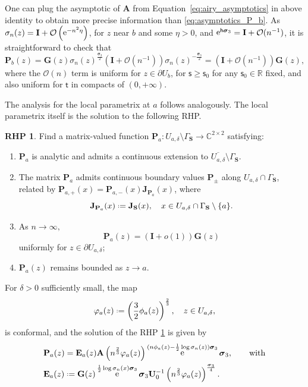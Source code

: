 \documentclass[reqno,a4paper,11pt]{amsart}
\DeclareMathOperator{\ee}{\rm e}
\newcommand{\C}{\mathbb{C}}
\newcommand{\R}{\mathbb{R}}
\newcommand{\boh}{\mathit{o}}
\newcommand{\Boh}{\mathcal{O}}
\newcommand*{\deff}{\mathrel{\vcenter{\baselineskip0.5ex \lineskiplimit0pt
                     \hbox{\scriptsize.}\hbox{\scriptsize.}}}%
                     =}
\renewcommand{\bm}{\mathbf}
\newcommand{\msf}{\mathsf}
\renewcommand{\sp}{\boldsymbol \sigma}
\newcommand{\tad}{\msf t}
\newcommand{\sad}{\msf s}
\theoremstyle{definition}
\newtheorem{rhp}[theorem]{RHP}
\theoremstyle{remark}
\numberwithin{equation}{section}
\newcommand*{\defeq}{\mathrel{\vcenter{\baselineskip0.5ex \lineskiplimit0pt
                     \hbox{\scriptsize.}\hbox{\scriptsize.}}}%
                     =}
\begin{document}
    One can plug the asymptotic of $\bm A$ from Equation~\eqref{eq:airy_asymptotics} in above identity to obtain more precise information than \eqref{eq:asymptotics_P_b}. As $\sigma_n(z) = \bm I + \Boh\left(\ee^{ - n^2 \eta} \right)$, for $z$ near $b$ and some $\eta > 0$, and $\ee^{\msf h \sp_3} =\bm I + \Boh(n^{-1})$, it is straightforward to check that 
    \begin{equation}\label{eq:precise_asymptotics_P_b}
        \bm P_b(z) 
        = \bm G(z) \sigma_n(z)^{\frac{\sp_3}{2}} \left(  \bm I + \Boh( n^{-1})\right) \sigma_n(z)^{-\frac{\sp_3}{2}} 
        = \left( \bm I + \Boh(n^{-1})\right) \bm G(z),
    \end{equation}
    where the $\Boh(n)$ term is uniform for $z \in \partial U_b$, for $\sad \geq \sad_0$ for any $\sad_0\in \R$ fixed, and also uniform for $\tad$ in compacts of $(0,+\infty)$.

    The analysis for the local parametrix at $a$ follows analogously. The local parametrix itself is the solution to the following RHP.
    \begin{rhp}\label{rhp:local_a}
        Find a matrix-valued function $\bm P_a: U_{a,\delta} \setminus \Gamma_{\bm S} \to \C^{2 \times 2}$ satisfying:
            \begin{enumerate}[\rm (i)]
                \item $\bm P_a$ is analytic and admits a continuous extension to $\overline{U_{a,\delta}} \setminus \Gamma_{\bm S}$.
                \item The matrix $\bm P_a$ admits continuous boundary values $\bm P_{\pm}$ along $U_{a,\delta} \cap \Gamma_{\bm S}$, related by $\bm P_{a,+}(x) = \bm P_{a,-}(x) \bm J_{\bm P_a}(x)$, where
                \[
                    \bm J_{\bm P_a}(x) \deff \bm J_{\bm S}(x),\quad x\in U_{a,\delta} \cap \Gamma_{\bm S}\setminus \{a\}.
                \]
                \item As $n \to \infty,$
                \[
                    \bm P_a (z) = \left( \bm I + \boh(1) \right) \bm G(z)
                \]
                uniformly for $z \in \partial U_{a,\delta}$;
                \item $\bm P_a(z)$ remains bounded as $z \to a$.
            \end{enumerate}
    \end{rhp}

    For $\delta>0$ sufficiently small, the map
%
    \[
        \varphi_a(z) \defeq \left( \frac{3}{2} \phi_a(z)\right)^{\frac{2}{3}},\quad z\in U_{a,\delta},
    \]
%
    is conformal, and the solution of the RHP \ref{rhp:local_a} is given by
    \begin{align*}
        & \bm P_a(z) = 
            \bm{E}_a(z) \bm A\left( n^{\frac{2}{3}} \varphi_a(z) \right) \ee^{(n \phi_a(z) - \frac{1}{2} \log \sigma_n(z))\sp_3} \sp_3, \qquad \text{with}\\
            & {\bm E}_a(z) \defeq \bm G(z) \ee^{\frac{1}{2} \log \sigma_n(x) \sp_3} \sp_3 \bm U_0^{-1} \left( n^{\frac{2}{3}} \varphi_a(z) \right)^{\frac{\sp_3}{4}}.
    \end{align*}
    
\end{document}
